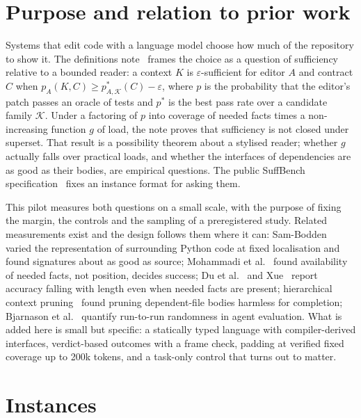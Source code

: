 \documentclass[10pt]{article}
\newcommand{\eps}{\varepsilon}
\begin{document}
\section{Purpose and relation to prior work}

Systems that edit code with a language model choose how much of the repository to show it. The definitions note~\cite{johansen2026note} frames the choice as a question of sufficiency relative to a bounded reader: a context $K$ is $\eps$-sufficient for editor $A$ and contract $C$ when $p_A(K,C) \ge p^*_{A,\mathcal K}(C) - \eps$, where $p$ is the probability that the editor's patch passes an oracle of tests and $p^*$ is the best pass rate over a candidate family $\mathcal K$. Under a factoring of $p$ into coverage of needed facts times a non-increasing function $g$ of load, the note proves that sufficiency is not closed under superset. That result is a possibility theorem about a stylised reader; whether $g$ actually falls over practical loads, and whether the interfaces of dependencies are as good as their bodies, are empirical questions. The public SuffBench specification~\cite{suffbenchspec} fixes an instance format for asking them.

This pilot measures both questions on a small scale, with the purpose of fixing the margin, the controls and the sampling of a preregistered study. Related measurements exist and the design follows them where it can: Sam-Bodden~\cite{sambodden2026context} varied the representation of surrounding Python code at fixed localisation and found signatures about as good as source; Mohammadi et al.~\cite{mohammadi2026workingset} found availability of needed facts, not position, decides success; Du et al.~\cite{du2025length} and Xue~\cite{xue2026contextrot} report accuracy falling with length even when needed facts are present; hierarchical context pruning~\cite{zhang2024hcp} found pruning dependent-file bodies harmless for completion; Bjarnason et al.~\cite{bjarnason2026randomness} quantify run-to-run randomness in agent evaluation. What is added here is small but specific: a statically typed language with compiler-derived interfaces, verdict-based outcomes with a frame check, padding at verified fixed coverage up to 200k tokens, and a task-only control that turns out to matter.

\section{Instances}
\end{document}
